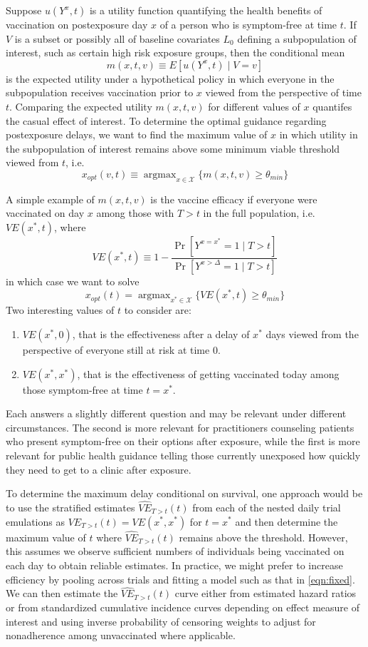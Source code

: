 \begin{appendix}
    Suppose $u(Y^x, t)$ is a utility function quantifying the health benefits of vaccination on postexposure day $x$ of a person who is symptom-free at time $t$. If $V$ is a subset or possibly all of baseline covariates $L_0$ defining a subpopulation of interest, such as certain high risk exposure groups, then the conditional mean
    $$m(x, t, v) \equiv E[u(Y^x, t) \mid V = v]$$
    is the expected utility under a hypothetical policy in which everyone in the subpopulation receives vaccination prior to $x$ viewed from the perspective of time $t$. Comparing the expected utility $m(x, t, v)$ for different values of $x$ quantifes the casual effect of interest. To determine the optimal guidance regarding postexposure delays, we want to find the maximum value of $x$ in which 
    utility in the subpopulation of interest remains above some minimum viable threshold viewed from $t$, i.e.
    $$x_{opt}(v, t) \equiv \operatorname{argmax}_{x \in \mathcal{X}} \{m(x, t, v) \geq \theta_{min} \}$$
    
    A simple example of $m(x, t, v)$ is the vaccine efficacy if everyone were vaccinated on day $x$ among those with $T > t$ in the full population, i.e. $VE(x^*, t)$, where
    $$VE(x^*, t) \equiv 1 - \frac{\Pr[Y^{x=x^*} = 1 \mid T > t]}{\Pr[Y^{x > \Delta} = 1 \mid T > t]}$$
    in which case we want to solve  
    $$x_{opt}(t) = \operatorname{argmax}_{x^* \in \mathcal{X}} \{VE(x^*, t) \geq \theta_{min} \}$$
    Two interesting values of $t$ to consider are:
    \begin{enumerate}
        \item $VE(x^*, 0)$, that is the effectiveness after a delay of $x^*$ days viewed from the perspective of everyone still at risk at time 0. 
        \item $VE(x^*, x^*)$, that is the effectiveness of getting vaccinated today among those symptom-free at time $t = x^*$.
    \end{enumerate}
    Each answers a slightly different question and may be relevant under different circumstances. The second is more relevant for practitioners counseling patients who present symptom-free on their options after exposure, while the first is more relevant for public health guidance telling those currently unexposed how quickly they need to get to a clinic after exposure. 

    To determine the maximum delay conditional on survival, one approach would be to use the stratified estimates $\widehat{VE}_{T > t}(t)$ from each of the nested daily trial emulations as $VE_{T > t}(t) = VE(x^*, x^*)$ for $t = x^*$ and then determine the maximum value of $t$ where  $\widehat{VE}_{T > t}(t)$ remains above the threshold. However, this assumes we observe sufficient numbers of individuals being vaccinated on each day to obtain reliable estimates. In practice, we might prefer to increase efficiency by pooling across trials and fitting a model such as that in \ref{eqn:fixed}. We can then estimate the $\widehat{VE}_{T > t}(t)$ curve either from estimated hazard ratios or from standardized cumulative incidence curves depending on effect measure of interest and using inverse probability of censoring weights to adjust for nonadherence among unvaccinated where applicable.


\end{appendix}
